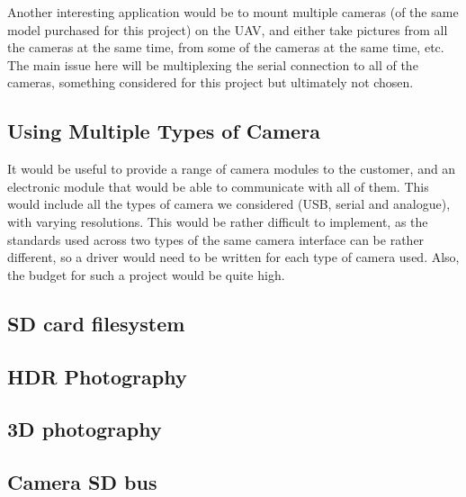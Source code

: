 Another interesting application would be to mount multiple cameras (of the same 
model purchased for this project) on the UAV, and either take pictures from all 
the cameras at the same time, from some of the cameras at the same time, etc. 
The main issue here will be multiplexing the serial connection to all of the 
cameras, something considered for this project but ultimately not chosen.

\subsection{Using Multiple Types of Camera}

It would be useful to provide a range of camera modules to the customer, and 
an electronic module that would be able to communicate with all of them. This 
would include all the types of camera we considered (USB, serial and analogue), 
with varying resolutions. This would be rather difficult to implement, as the 
standards used across two types of the same camera interface can be rather 
different, so a driver would need to be written for each type of camera used. 
Also, the budget for such a project would be quite high.

\subsection{SD card filesystem}

\subsection{HDR Photography}

\subsection{3D photography}

\subsection{Camera SD bus}

